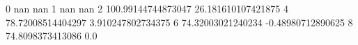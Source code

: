 0 nan nan
1 nan nan
2 100.99144744873047 26.181610107421875
4 78.72008514404297 3.910247802734375
6 74.32003021240234 -0.48980712890625
8 74.8098373413086 0.0
